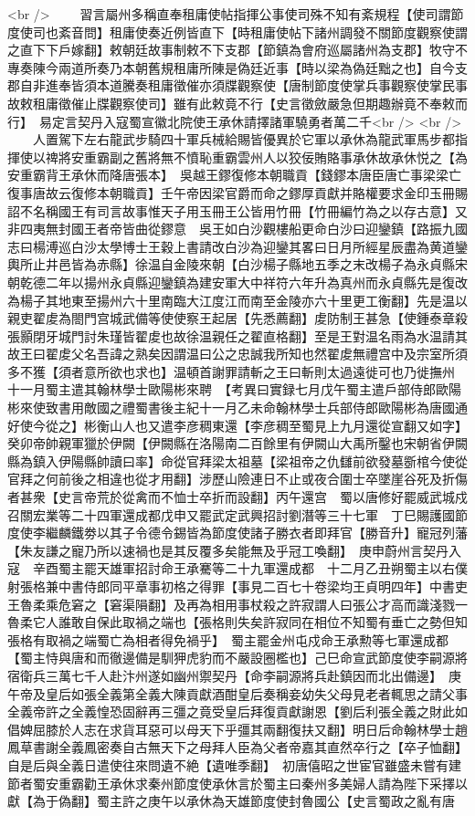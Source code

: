 <br />
　　習言屬州多稱直奉租庸使帖指揮公事使司殊不知有紊規程【使司謂節度使司也紊音問】租庸使奏近例皆直下【時租庸使帖下諸州調發不關節度觀察使謂之直下下戶嫁翻】敕朝廷故事制敕不下支郡【節鎮為會府巡屬諸州為支郡】牧守不專奏陳今兩道所奏乃本朝舊規租庸所陳是偽廷近事【時以梁為偽廷黜之也】自今支郡自非進奉皆須本道騰奏租庸徵催亦須牒觀察使【唐制節度使掌兵事觀察使掌民事故敕租庸徵催止牒觀察使司】雖有此敕竟不行【史言徵斂嚴急但期趣辦竟不奉敕而行】　易定言契丹入寇蜀宣徽北院使王承休請擇諸軍驍勇者萬二千<br />
<br />
　　人置駕下左右龍武步騎四十軍兵械給賜皆優異於它軍以承休為龍武軍馬步都指揮使以禆將安重霸副之舊將無不憤恥重霸雲州人以狡佞賄賂事承休故承休悦之【為安重霸背王承休而降唐張本】　吳越王鏐復修本朝職貢【錢鏐本唐臣唐亡事梁梁亡復事唐故云復修本朝職貢】壬午帝因梁官爵而命之鏐厚貢獻并賂權要求金印玉冊賜詔不名稱國王有司言故事惟天子用玉冊王公皆用竹冊【竹冊編竹為之以存古意】又非四夷無封國王者帝皆曲從鏐意　吳王如白沙觀樓船更命白沙曰迎鑾鎮【路振九國志曰楊溥巡白沙太學博士王穀上書請改白沙為迎鑾其畧曰日月所經星辰盡為黄道鑾輿所止井邑皆為赤縣】徐温自金陵來朝【白沙楊子縣地五季之末改楊子為永貞縣宋朝乾德二年以揚州永貞縣迎鑾鎮為建安軍大中祥符六年升為真州而永貞縣先是復改為楊子其地東至揚州六十里南臨大江度江而南至金陵亦六十里更工衡翻】先是温以親吏翟䖍為閤門宫城武備等使使察王起居【先悉薦翻】䖍防制王甚急【使鍾泰章殺張顥閉牙城門討朱瑾皆翟䖍也故徐温親任之翟直格翻】至是王對温名雨為水温請其故王曰翟䖍父名吾諱之熟矣因謂温曰公之忠誠我所知也然翟䖍無禮宫中及宗室所須多不獲【須者意所欲也求也】温頓首謝罪請斬之王曰斬則太過遠徙可也乃徙撫州　十一月蜀主遣其翰林學士歐陽彬來聘　【考異曰實録七月戊午蜀主遣戶部侍郎歐陽彬來使致書用敵國之禮蜀書後主紀十一月乙未命翰林學士兵部侍郎歐陽彬為唐國通好使今從之】彬衡山人也又遣李彦稠東還【李彦稠至蜀見上九月還從宣翻又如字】　癸卯帝帥親軍獵於伊闕【伊闕縣在洛陽南二百餘里有伊闕山大禹所鑿也宋朝省伊闕縣為鎮入伊陽縣帥讀曰率】命從官拜梁太祖墓【梁祖帝之仇讎前欲發墓斵棺今使從官拜之何前後之相違也從才用翻】涉歷山險連日不止或夜合圍士卒墜崖谷死及折傷者甚衆【史言帝荒於從禽而不恤士卒折而設翻】丙午還宫　蜀以唐修好罷威武城戍召關宏業等二十四軍還成都戊申又罷武定武興招討劉潛等三十七軍　丁巳賜護國節度使李繼麟鐵劵以其子令德令錫皆為節度使諸子勝衣者即拜官【勝音升】寵冠列藩【朱友謙之寵乃所以速禍也是其反覆多矣能無及乎冠工喚翻】　庚申蔚州言契丹入寇　辛酉蜀主罷天雄軍招討命王承騫等二十九軍還成都　十二月乙丑朔蜀主以右僕射張格兼中書侍郎同平章事初格之得罪【事見二百七十卷梁均王貞明四年】中書吏王魯柔乘危窘之【窘渠隕翻】及再為相用事杖殺之許寂謂人曰張公才高而識淺戮一魯柔它人誰敢自保此取禍之端也【張格則失矣許寂同在相位不知蜀有垂亡之勢但知張格有取禍之端蜀亡為相者得免禍乎】　蜀主罷金州屯戍命王承勲等七軍還成都【蜀主恃與唐和而徹邊備是馴狎虎豹而不嚴設圈檻也】己巳命宣武節度使李嗣源將宿衛兵三萬七千人赴汴州遂如幽州禦契丹【命李嗣源將兵赴鎮因而北出備邊】　庚午帝及皇后如張全義第全義大陳貢獻酒酣皇后奏稱妾幼失父母見老者輒思之請父事全義帝許之全義惶恐固辭再三彊之竟受皇后拜復貢獻謝恩【劉后利張全義之財此如倡婢屈膝於人志在求貨耳惡可以母天下乎彊其兩翻復扶又翻】明日后命翰林學士趙鳳草書謝全義鳳密奏自古無天下之母拜人臣為父者帝嘉其直然卒行之【卒子恤翻】自是后與全義日遣使往來問遺不絶【遺唯季翻】　初唐僖昭之世宦官雖盛未嘗有建節者蜀安重霸勸王承休求秦州節度使承休言於蜀主曰秦州多美婦人請為陛下采擇以獻【為于偽翻】蜀主許之庚午以承休為天雄節度使封魯國公【史言蜀政之亂有唐